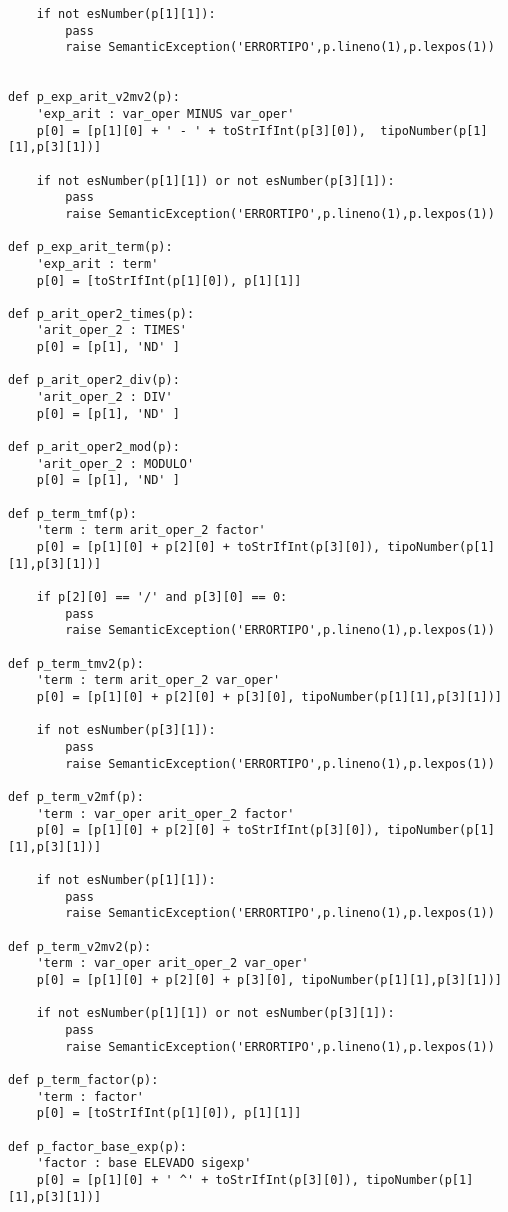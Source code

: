 \begin{verbatim}
    if not esNumber(p[1][1]):
        pass
        raise SemanticException('ERRORTIPO',p.lineno(1),p.lexpos(1))


def p_exp_arit_v2mv2(p):
    'exp_arit : var_oper MINUS var_oper'
    p[0] = [p[1][0] + ' - ' + toStrIfInt(p[3][0]),  tipoNumber(p[1][1],p[3][1])]

    if not esNumber(p[1][1]) or not esNumber(p[3][1]):
        pass
        raise SemanticException('ERRORTIPO',p.lineno(1),p.lexpos(1))

def p_exp_arit_term(p):
    'exp_arit : term'
    p[0] = [toStrIfInt(p[1][0]), p[1][1]]

def p_arit_oper2_times(p):
    'arit_oper_2 : TIMES'
    p[0] = [p[1], 'ND' ]

def p_arit_oper2_div(p):
    'arit_oper_2 : DIV'
    p[0] = [p[1], 'ND' ]

def p_arit_oper2_mod(p):
    'arit_oper_2 : MODULO'
    p[0] = [p[1], 'ND' ]

def p_term_tmf(p):
    'term : term arit_oper_2 factor'
    p[0] = [p[1][0] + p[2][0] + toStrIfInt(p[3][0]), tipoNumber(p[1][1],p[3][1])]

    if p[2][0] == '/' and p[3][0] == 0:
        pass
        raise SemanticException('ERRORTIPO',p.lineno(1),p.lexpos(1))

def p_term_tmv2(p):
    'term : term arit_oper_2 var_oper'
    p[0] = [p[1][0] + p[2][0] + p[3][0], tipoNumber(p[1][1],p[3][1])]

    if not esNumber(p[3][1]):
        pass
        raise SemanticException('ERRORTIPO',p.lineno(1),p.lexpos(1))

def p_term_v2mf(p):
    'term : var_oper arit_oper_2 factor'
    p[0] = [p[1][0] + p[2][0] + toStrIfInt(p[3][0]), tipoNumber(p[1][1],p[3][1])]

    if not esNumber(p[1][1]):
        pass
        raise SemanticException('ERRORTIPO',p.lineno(1),p.lexpos(1))

def p_term_v2mv2(p):
    'term : var_oper arit_oper_2 var_oper'
    p[0] = [p[1][0] + p[2][0] + p[3][0], tipoNumber(p[1][1],p[3][1])]

    if not esNumber(p[1][1]) or not esNumber(p[3][1]):
        pass
        raise SemanticException('ERRORTIPO',p.lineno(1),p.lexpos(1))

def p_term_factor(p):
    'term : factor'
    p[0] = [toStrIfInt(p[1][0]), p[1][1]]

def p_factor_base_exp(p):
    'factor : base ELEVADO sigexp'
    p[0] = [p[1][0] + ' ^' + toStrIfInt(p[3][0]), tipoNumber(p[1][1],p[3][1])]



\end{verbatim}
